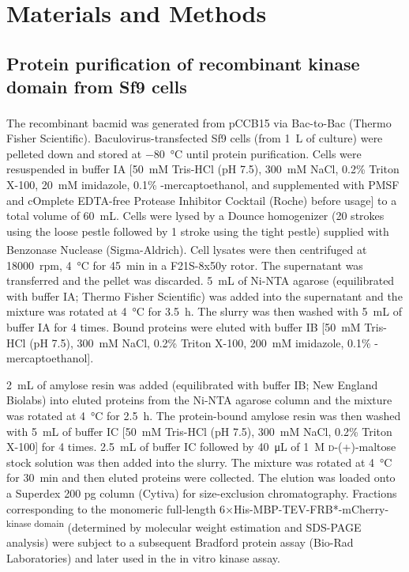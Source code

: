 \section{Materials and Methods}
\subsection{Protein purification of recombinant  kinase domain from Sf9 cells}
The recombinant bacmid was generated from pCCB15 via Bac-to-Bac\textsuperscript{\textregistered} (Thermo Fisher Scientific). Baculovirus-transfected Sf9 cells (from \SI{1}{L} of culture) were pelleted down and stored at \SI{-80}{\celsius} until protein purification. Cells were resuspended in buffer IA [\SI{50}{mM} Tris-HCl (pH 7.5), \SI{300}{mM} NaCl, 0.2\% Triton X-100, \SI{20}{mM} imidazole, 0.1\% \textbeta-mercaptoethanol, and supplemented with PMSF and cOmplete\texttrademark{} EDTA-free Protease Inhibitor Cocktail (Roche) before usage] to a total volume of \SI{60}{mL}. Cells were lysed by a Dounce homogenizer (20 strokes using the loose pestle followed by 1 stroke using the tight pestle) supplied with Benzonase\textsuperscript{\textregistered} Nuclease (Sigma-Aldrich). Cell lysates were then centrifuged at \SI{18000}{rpm}, \SI{4}{\celsius} for \SI{45}{min} in a F21S-8x50y rotor. The supernatant was transferred and the pellet was discarded. \SI{5}{mL} of Ni-NTA agarose (equilibrated with buffer IA; Thermo Fisher Scientific) was added into the supernatant and the mixture was rotated at \SI{4}{\celsius} for \SI{3.5}{h}. The slurry was then washed with \SI{5}{mL} of buffer IA for 4 times. Bound proteins were eluted with buffer IB [\SI{50}{mM} Tris-HCl (pH 7.5), \SI{300}{mM} NaCl, 0.2\% Triton X-100, \SI{200}{mM} imidazole, 0.1\% \textbeta-mercaptoethanol].

\SI{2}{mL} of amylose resin was added (equilibrated with buffer IB; New England Biolabs) into eluted proteins from the Ni-NTA agarose column and the mixture was rotated at \SI{4}{\celsius} for \SI{2.5}{h}. The protein-bound amylose resin was then washed with \SI{5}{mL} of buffer IC [\SI{50}{mM} Tris-HCl (pH 7.5), \SI{300}{mM} NaCl, 0.2\% Triton X-100] for 4 times. \SI{2.5}{mL} of buffer IC followed by \SI{40}{\micro L} of \SI{1}{M} \textsc{d}-(+)-maltose stock solution was then added into the slurry. The mixture was rotated at \SI{4}{\celsius} for \SI{30}{min} and then eluted proteins were collected. The elution was loaded onto a Superdex 200 pg column (Cytiva) for size-exclusion chromatography. Fractions corresponding to the monomeric full-length 6×His-MBP-TEV-FRB*-mCherry-\textsuperscript{kinase domain} (determined by molecular weight estimation and SDS-PAGE analysis) were subject to a subsequent Bradford protein assay (Bio-Rad Laboratories) and later used in the in vitro kinase assay.

